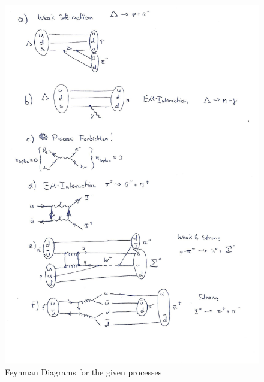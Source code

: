 \documentclass{article}
\begin{document}
\begin{figure}
    \centering
    \includegraphics[trim=0 80 0 10,clip,width=\textwidth]{sheet_1_scan.png}
    \caption{Feynman Diagrams for the given processes}
    \label{figure:feynman}
\end{figure}
\end{document}
